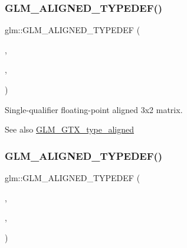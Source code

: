 \subsubsection{\texorpdfstring{G\+L\+M\+\_\+\+A\+L\+I\+G\+N\+E\+D\+\_\+\+T\+Y\+P\+E\+D\+E\+F()}{GLM\_ALIGNED\_TYPEDEF()}\hspace{0.1cm}{\footnotesize\ttfamily [187/209]}}
{\footnotesize\ttfamily glm\+::\+G\+L\+M\+\_\+\+A\+L\+I\+G\+N\+E\+D\+\_\+\+T\+Y\+P\+E\+D\+EF (\begin{DoxyParamCaption}\item[{\hyperlink{group__gtc__type__precision_ga924b933089d954df062aa8d0735fc005}{f32mat3x2}}]{,  }\item[{aligned\+\_\+f32mat3x2}]{,  }\item[{16}]{ }\end{DoxyParamCaption})}

Single-\/qualifier floating-\/point aligned 3x2 matrix. \begin{DoxySeeAlso}{See also}
\hyperlink{group__gtx__type__aligned}{G\+L\+M\+\_\+\+G\+T\+X\+\_\+type\+\_\+aligned} 
\end{DoxySeeAlso}
\mbox{\label{group__gtx__type__aligned_ga3f510999e59e1b309113e1d561162b29}} 
\subsubsection{\texorpdfstring{G\+L\+M\+\_\+\+A\+L\+I\+G\+N\+E\+D\+\_\+\+T\+Y\+P\+E\+D\+E\+F()}{GLM\_ALIGNED\_TYPEDEF()}\hspace{0.1cm}{\footnotesize\ttfamily [188/209]}}
{\footnotesize\ttfamily glm\+::\+G\+L\+M\+\_\+\+A\+L\+I\+G\+N\+E\+D\+\_\+\+T\+Y\+P\+E\+D\+EF (\begin{DoxyParamCaption}\item[{\hyperlink{group__gtc__type__precision_ga177c076d6d9aea27a5ae87b52607e57a}{f32mat3x3}}]{,  }\item[{aligned\+\_\+f32mat3x3}]{,  }\item[{16}]{ }\end{DoxyParamCaption})}

